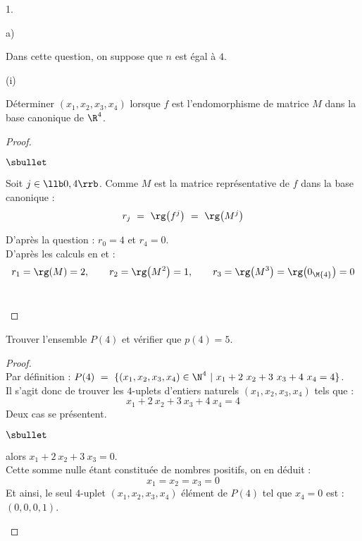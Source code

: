 \begin{noliste}{1.}
\begin{noliste}{a)}
    \newpage


  \item Dans cette question, on suppose que $n$ est égal à $4$.
  \end{noliste}
    \begin{noliste}{(i)}
    \item Déterminer $(x_1,x_2,x_3,x_4)$ lorsque $f$ est
      l'endomorphisme de matrice $M$ dans la base canonique
      \nolinebreak de $\R^4$.

      \begin{proof}~%
        \begin{noliste}{$\sbullet$}
        \item Soit $j \in \llb 0, 4 \rrb$. Comme $M$ est la matrice
          représentative de $f$ dans la base canonique :
          \[
          r_j \ = \ \rg\big( f^j \big) \ = \ \rg\big( M^j \big)
          \]

        \item D'après la question  : $r_0 = 4$ et $r_4 = 0$.\\
          D'après les calculs en  et  :
          \[
          r_1 = \rg(M) = 2, \qquad r_2 = \rg\big( M^2 \big) = 1,
          \qquad r_3 = \rg\big( M^3 \big) = \rg\big( 0_{\M{4}} \big) =
          0
          \]
          ~\\[-1.2cm]
        \end{noliste}
      \end{proof}
      
    \item Trouver l'ensemble $P(4)$ et vérifier que $p(4)=5$.
    \end{noliste}

    \begin{proof}~\\%
      Par définition : $P(4) \ = \ \{ (x_1, x_2, x_3, x_4) \in \N^4 \
      | \ x_1 + 2 \ x_2 + 3 \ x_3 + 4 \ x_4 = 4\}$.\\
      Il s'agit donc de trouver les $4$-uplets d'entiers naturels
      $(x_1, x_2, x_3, x_4)$ tels que : 
      \[
      x_1 + 2 \ x_2 + 3 \ x_3 + 4 \ x_4 = 4
      \]
      Deux cas se présentent.
      \begin{noliste}{$\sbullet$}
      \item {} alors $x_1 + 2 \ x_2 + 3 \ x_3 =
        0$.\\
        Cette somme nulle étant constituée de nombres positifs, on en
        déduit :
        \[
        x_1 = x_2 = x_3 = 0
        \]
        Et ainsi, le seul $4$-uplet $(x_1, x_2, x_3, x_4)$ élément de
        $P(4)$ tel que $x_4 = 0$ est : $(0, 0, 0, 1)$.


\end{noliste}
\end{proof}
\end{noliste}
